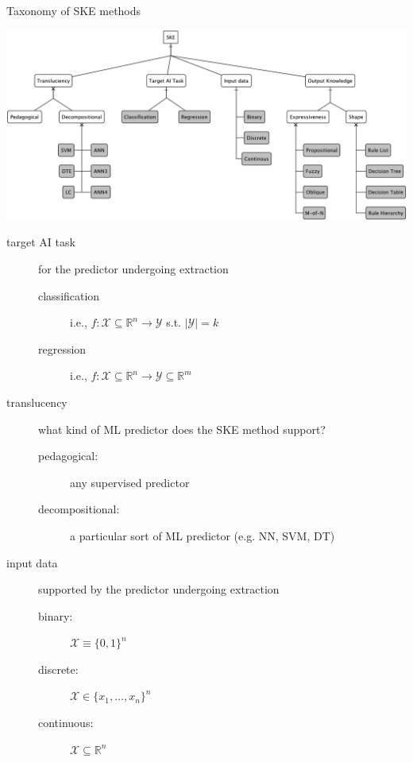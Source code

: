 \documentclass[presentation]{beamer}\mode<presentation>{\usetheme{AMSBolognaFC}}
\begin{document}
\begin{frame}[allowframebreaks]{Taxonomy of SKE methods}
    \begin{center}
        \includegraphics[width=\linewidth]{figures/ske-taxonomy.pdf}
    \end{center}
    
    \framebreak

    \begin{description}
        \item[target AI task] for the predictor undergoing extraction
        \begin{description}
            \item[classification] i.e., $f: \mathcal{X} \subseteq \mathbb{R}^n \rightarrow \mathcal{Y}$ s.t. $|\mathcal{Y}| = k$
            \item[regression] i.e., $f: \mathcal{X} \subseteq \mathbb{R}^n \rightarrow \mathcal{Y} \subseteq \mathbb{R}^m$     
        \end{description} 

        \medskip

        \item[translucency] what kind of ML predictor does the SKE method support?
        \begin{description}
            \item[pedagogical:] any supervised predictor
            \item[decompositional:] a particular sort of ML predictor (e.g. NN, SVM, DT)      
        \end{description} 

        \medskip

        \item[input data] supported by the predictor undergoing extraction
        \begin{description}
            \item[binary:] $\mathcal{X} \equiv \{0, 1\}^n$
            \item[discrete:] $\mathcal{X} \in \{x_1, \ldots, x_n\}^n$   
            \item[continuous:] $\mathcal{X} \subseteq \mathbb{R}^n$     
        \end{description} 


\end{description}
\end{frame}
\end{document}
